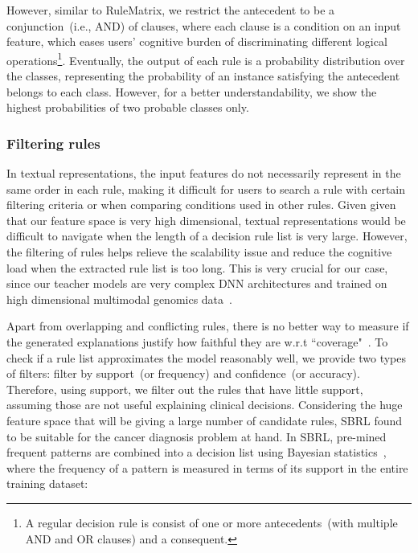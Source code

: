 \hspace*{3.5mm} However, similar to RuleMatrix, we restrict the antecedent to be a conjunction~(i.e., AND) of clauses, where each clause is a condition on an input feature, which eases users' cognitive burden of discriminating different logical operations\footnote{A regular  decision rule is consist of one or more antecedents~(with multiple AND and OR clauses) and a consequent.}. Eventually, the output of each rule is a probability distribution over the classes, representing the probability of an instance satisfying the antecedent belongs to each class. However, for a better understandability, we show the highest probabilities of two probable classes only. 

\subsubsection{Filtering rules}
In textual representations, the input features do not necessarily represent in the same order in each rule, making it difficult for users to search a rule with certain filtering criteria or when comparing conditions used in other rules. Given given that our feature space is very high dimensional, textual representations would be difficult to navigate when the length of a decision rule list is very large. However, the filtering of rules helps relieve the scalability issue and reduce the cognitive load when the extracted rule list is too long. This is very crucial for our case, since our teacher models are very complex DNN architectures and trained on high dimensional multimodal genomics data~\cite{ribeiro2018anchors}. 

\hspace*{3.5mm} Apart from overlapping and conflicting rules, there is no better way to measure if the generated explanations justify how faithful they are w.r.t ``coverage"~\cite{ming2018rulematrix}. To check if a rule list approximates the model reasonably well, we provide two types of filters: filter by support~(or frequency) and confidence~(or accuracy). Therefore, using support, we filter out the rules that have little support, assuming those are not useful explaining clinical decisions. Considering the huge feature space that will be giving a large number of candidate rules, SBRL found to be suitable for the cancer diagnosis problem at hand. In SBRL, pre-mined frequent patterns are combined into a decision list using Bayesian statistics~\cite{molnar2019interpretable}, where the frequency of a pattern is measured in terms of its support in the entire training dataset:


